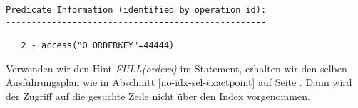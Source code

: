 \documentclass[11pt,a4paper,parskip=half]{scrartcl}
\begin{document}
\begin{lstlisting}
Predicate Information (identified by operation id):                                                                                                                                                                                                                                                          
---------------------------------------------------                                                                                                                                                                                                                                                          
                                                                                                                                                                                                                                                                                                             
   2 - access("O_ORDERKEY"=44444)    
\end{lstlisting}

Verwenden wir den Hint \emph{FULL(orders)} im Statement, erhalten wir den selben Ausführungsplan wie in Abschnitt \ref{no-idx-sel-exactpoint} auf Seite \pageref{no-idx-sel-exactpoint}. Dann wird der Zugriff auf die gesuchte Zeile nicht über den Index vorgenommen.
\end{document}
